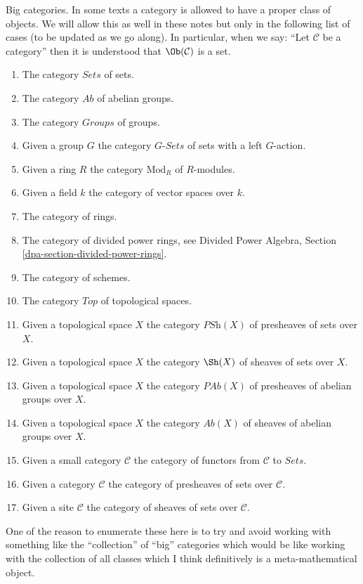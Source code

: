 \begin{remark}
\label{remark-big-categories}
Big categories. In some texts a category is allowed to have a proper
class of objects. We will allow this as well in these notes but only
in the following list of cases (to be updated as we go along).
In particular, when we say: ``Let $\mathcal{C}$ be a category''
then it is understood that $\Ob(\mathcal{C})$ is a set.
\begin{enumerate}
\item The category $\textit{Sets}$ of sets.
\item The category $\textit{Ab}$ of abelian groups.
\item The category $\textit{Groups}$ of groups.
\item Given a group $G$ the category $G\textit{-Sets}$ of
sets with a left $G$-action.
\item Given a ring $R$ the category $\text{Mod}_R$ of $R$-modules.
\item Given a field $k$ the category of vector spaces over $k$.
\item The category of rings.
\item The category of divided power rings, see
Divided Power Algebra, Section \ref{dpa-section-divided-power-rings}.
\item The category of schemes.
\item The category $\textit{Top}$ of topological spaces.
\item Given a topological space $X$ the category
$\textit{PSh}(X)$ of presheaves of sets over $X$.
\item Given a topological space $X$ the category
$\Sh(X)$ of sheaves of sets over $X$.
\item Given a topological space $X$ the category
$\textit{PAb}(X)$ of presheaves of abelian groups over $X$.
\item Given a topological space $X$ the category
$\textit{Ab}(X)$ of sheaves of abelian groups over $X$.
\item Given a small category $\mathcal{C}$ the category of functors
from $\mathcal{C}$ to $\textit{Sets}$.
\item Given a category $\mathcal{C}$ the category of presheaves of sets
over $\mathcal{C}$.
\item Given a site $\mathcal{C}$ the category of sheaves
of sets over $\mathcal{C}$.
\end{enumerate}
One of the reason to enumerate these here is to try and avoid
working with something like the ``collection'' of ``big'' categories
which would be like working with the collection of all classes
which I think definitively is a meta-mathematical object.
\end{remark}

